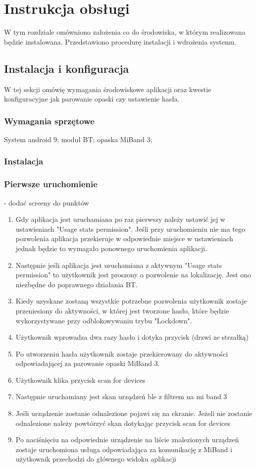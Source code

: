 \chapter{Instrukcja obsługi}
\thispagestyle{chapterBeginStyle}
\label{rozdzial4}

W tym rozdziale omówniono założenia co do środowiska, w którym realizowana będzie instalowana. Przedstawiono procedurę instalacji i wdrożenia systemu. 

\section{Instalacja i konfiguracja}
W tej sekcji omówię wymagania środowiskowe aplikacji oraz kwestie konfiguracyjne jak parowanie opaski czy ustawienie hasła.
\subsection{Wymagania sprzętowe}
System android 9; moduł BT; opaska MiBand 3; 
\subsection{Instalacja}
\subsection{Pierwsze uruchomienie}
- dodać screeny do punktów
\begin{enumerate}
    \item Gdy aplikacja jest uruchamiana po raz pierwszy należy ustawić jej w ustawieniach "Usage stats permission". Jeśli przy uruchomieniu nie ma tego pozwolenia aplikacja przekieruje w odpowiednie miejsce w ustawieniach jednak będzie to wymagało ponownego uruchomienia aplikacji.
    \item Następnie jeśli aplikacja jest uruchamiana z aktywnym "Usage stats permission" to użytkownik jest proszony o pozwolenie na lokalizację. Jest ono niezbędne do poprawnego działania BT.
    \item Kiedy uzyskane zostaną wszystkie potrzebne pozwolenia użytkownik zostaje przeniesiony do aktywności, w której jest tworzone hasło, które będzie wykorzystywane przy odblokowywaniu trybu "Lockdown".
    \item  Użytkownik wprowadza dwa razy hasło i dotyka przycisk (drzwi ze strzałką)
    \item Po utworzeniu hasła użytkownik zostaje przekierowany do aktywności odpowiadającej za parowanie opaski MiBand 3. 
    \item Użytkownik klika przycisk scan for devices
    \item Następnie uruchamiany jest skan urządzeń ble z filtrem na mi band 3
    \item Jeśli urządzenie zostanie odnalezione pojawi się na ekranie. Jeżeli nie zostanie odnalezione należy powtórzyć skan dotykając przycisk scan for devices
    \item Po naciśnięciu na odpowiednie urządzenie na liście znalezionych urządzeń zostaje uruchomiona usługa odpowiadająca za komunikację z MiBand i użytkownik przechodzi do głównego widoku aplikacji
\end{enumerate}
